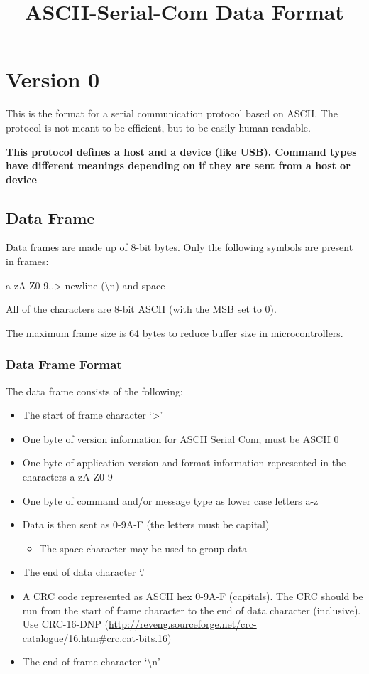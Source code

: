 \documentclass{customdocclass}
\title{ASCII-Serial-Com Data Format}
\begin{document}
\maketitle

\section{Version 0}

This is the format for a serial communication protocol based on ASCII. The
protocol is not meant to be efficient, but to be easily human readable.

\textbf{This protocol defines a host and a device (like USB). Command types
have different meanings depending on if they are sent from a host or device}

\subsection{Data Frame}

Data frames are made up of 8-bit bytes. Only the following symbols are present in frames:

\vspace{1em}

a-zA-Z0-9,.> newline (\textbackslash n) and space

\vspace{1em}

All of the characters are 8-bit ASCII (with the MSB set to 0).

The maximum frame size is 64 bytes to reduce buffer size in microcontrollers.

\subsubsection{Data Frame Format}

The data frame consists of the following:

\begin{itemize}
  \item The start of frame character `>'
  \item One byte of version information for ASCII Serial Com; must be ASCII 0
  \item One byte of application version and format information represented in the characters a-zA-Z0-9
  \item One byte of command and/or message type as lower case letters a-z
  \item Data is then sent as 0-9A-F (the letters must be capital)
  \begin{itemize}
    \item The space character may be used to group data
  \end{itemize}
  \item The end of data character `.'
  \item A CRC code represented as ASCII hex 0-9A-F (capitals). The CRC should be run from the start of frame character to the end of data character (inclusive). Use CRC-16-DNP (\url{http://reveng.sourceforge.net/crc-catalogue/16.htm\#crc.cat-bits.16})
  \item The end of frame character `\textbackslash n'
\end{itemize}
\end{document}
